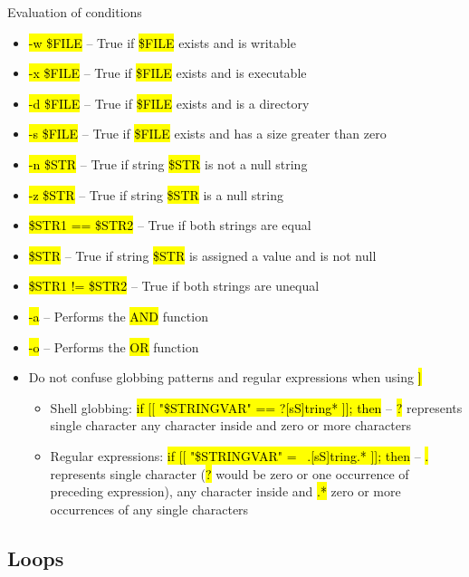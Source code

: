 \documentclass[compress, ucs, xelatex, 11pt, xcolor=svgnames,
  hyperref={
    bookmarks=true,
    unicode=true,
    colorlinks=true,
    pdftitle={Linux, command line and MetaCentrum},
    plainpages=false,
    pdfauthor={Vojtech Zeisek},
    pdfsubject={Course about use of Linux command line, writing shell scripts and using MetaCentrum of CESNET},
    pdfcreator={XeLaTeX},
    pdfkeywords={Linux, GNU, BASH, shell, command line, MetaCentrum},
    linkcolor=Red,
    anchorcolor=Blue,
    citecolor=Purple,
    filecolor=DodgerBlue,
    menucolor=DarkOrchid,
    urlcolor=DeepSkyBlue,
    pdftex},
  url={hyphens, lowtilde} %
  ]{beamer}
\renewcommand{\texttt}[1]{\hl{\ttfamily #1}}
\begin{document}
\begin{frame}[allowframebreaks]{Evaluation of conditions}
\begin{itemize}
  \item \texttt{-w \$FILE} -- True if \texttt{\$FILE} exists and is writable
  \item \texttt{-x \$FILE} -- True if \texttt{\$FILE} exists and is executable
  \item \texttt{-d \$FILE} -- True if \texttt{\$FILE} exists and is a directory
  \item \texttt{-s \$FILE} -- True if \texttt{\$FILE} exists and has a size greater than zero
  \item \texttt{-n \$STR} -- True if string \texttt{\$STR} is not a null string
  \item \texttt{-z \$STR} -- True if string \texttt{\$STR} is a null string
  \item \texttt{\$STR1 == \$STR2} -- True if both strings are equal
  \item \texttt{\$STR} -- True if string \texttt{\$STR} is assigned a value and is not null
  \item \texttt{\$STR1 != \$STR2} -- True if both strings are unequal
  \item \texttt{-a} -- Performs the \texttt{AND} function
  \item \texttt{-o} -- Performs the \texttt{OR} function
  \item Do not confuse globbing patterns and regular expressions when using \texttt{[[ \ldots~]]}
  \begin{itemize}
    \item Shell globbing: \texttt{if [[ "\$STRINGVAR" == ?[sS]tring* ]]; then} -- \texttt{?} represents single character \texttt{[]} any character inside and \texttt{*} zero or more characters
    \item Regular expressions: \texttt{if [[ "\$STRINGVAR" =~ .[sS]tring.* ]]; then} -- \texttt{.} represents single character (\texttt{?} would be zero or one occurrence of preceding expression), \texttt{[]} any character inside and \texttt{.*} zero or more occurrences of any single characters
  \end{itemize}
\end{itemize}
\end{frame}

\subsection{Loops}
\end{document}
